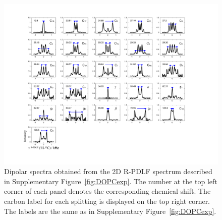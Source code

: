 \documentclass[fleqn,10pt]{wlscirepSI}
\begin{document}
\begin{figure}[p]
  \includegraphics[width=\textwidth]{Figures/DOPC_slices.pdf}
  \caption{Dipolar spectra obtained from the 2D R-PDLF spectrum described in Supplementary Figure~\ref{fig:DOPCexp}. The number at the top left corner of each panel denotes the corresponding chemical shift. The carbon label for each splitting is displayed on the top right corner. The labels are the same as in Supplementary Figure~\ref{fig:DOPCexp}. }
  \label{DOPCexp2}
\end{figure}




\renewcommand\refname{Supplementary References}

\pagebreak



\end{document}
